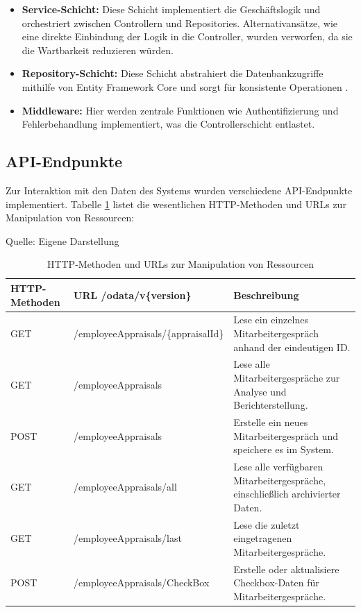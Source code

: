 \begin{itemize}
    \item \textbf{Service-Schicht:} Diese Schicht implementiert die Geschäftslogik und orchestriert zwischen Controllern und Repositories. Alternativansätze, wie eine direkte Einbindung der Logik in die Controller, wurden verworfen, da sie die Wartbarkeit reduzieren würden.
    \item \textbf{Repository-Schicht:} Diese Schicht abstrahiert die Datenbankzugriffe mithilfe von Entity Framework Core und sorgt für konsistente Operationen \cite{efCoreDocs2023}.
    \item \textbf{Middleware:} Hier werden zentrale Funktionen wie Authentifizierung und Fehlerbehandlung implementiert, was die Controllerschicht entlastet.
\end{itemize}

\subsection{API-Endpunkte}
Zur Interaktion mit den Daten des Systems wurden verschiedene API-Endpunkte implementiert. Tabelle \ref{table:http-methods} listet die wesentlichen HTTP-Methoden und URLs zur Manipulation von Ressourcen:

\begin{table}[H]
\caption{HTTP-Methoden und URLs zur Manipulation von Ressourcen}
\label{table:http-methods}
\raggedright
{\scriptsize Quelle: Eigene Darstellung} \\[0.3em]
\renewcommand{\arraystretch}{1.1}
\setlength{\tabcolsep}{1.8pt}
\begin{tabularx}{\textwidth}{>{\centering\arraybackslash}m{2cm}|>{\centering\arraybackslash}m{5.5cm}|>{\raggedright\arraybackslash}m{6.5cm}}
\hline
\textbf{HTTP-Methoden} & \textbf{URL /odata/v\{version\}} & \textbf{Beschreibung} \\\hline
GET & /employeeAppraisals/\{appraisalId\} & Lese ein einzelnes Mitarbeitergespräch anhand der eindeutigen ID. \\\hline
GET & /employeeAppraisals & Lese alle Mitarbeitergespräche zur Analyse und Berichterstellung. \\\hline
POST & /employeeAppraisals & Erstelle ein neues Mitarbeitergespräch und speichere es im System. \\\hline
GET & /employeeAppraisals/all & Lese alle verfügbaren Mitarbeitergespräche, einschließlich archivierter Daten. \\\hline
GET & /employeeAppraisals/last & Lese die zuletzt eingetragenen Mitarbeitergespräche. \\\hline
POST & /employeeAppraisals/CheckBox & Erstelle oder aktualisiere Checkbox-Daten für Mitarbeitergespräche. \\\hline
\end{tabularx}
\end{table}


